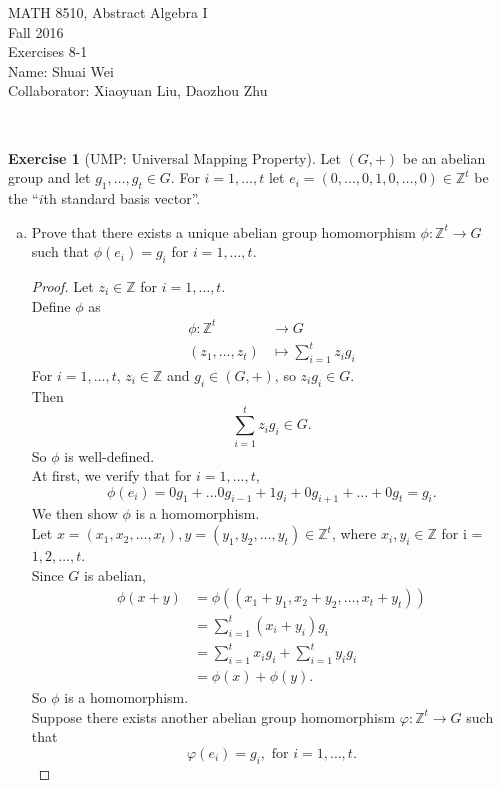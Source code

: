 \documentclass{article}
\newcommand{\bbz}{\mathbb{Z}}
\theoremstyle{plain}
\theoremstyle{definition}
\newtheorem{exer}[lem]{Exercise}
\begin{document}
\noindent MATH 8510, Abstract Algebra I \\
Fall 2016\\
Exercises 8-1\\
Name: Shuai Wei\\
Collaborator: Xiaoyuan Liu, Daozhou Zhu

\

%
%

\begin{exer}[UMP: Universal Mapping Property]
Let $(G,+)$ be an abelian group and let $g_1,\ldots,g_t\in G$. 
For $i=1,\ldots,t$ let $e_i=(0,\ldots,0,1,0,\ldots,0)\in\bbz^t$ be the ``$i$th standard basis vector''.
\begin{enumerate}[(a)]
\item 
Prove that there exists a unique abelian group homomorphism $\phi\colon\bbz^t\to G$ such that $\phi(e_i)=g_i$ for $i=1,\ldots,t$.
\begin{proof}
  Let $z_i \in \bbz$ for $i = 1,\ldots,t$.\\
  Define $\phi$ as
  \begin{align*}
  	\phi: \bbz^t &\to G \\
  			(z_1,\dots,z_t) & \mapsto \sum_{i=1}^tz_ig_i 
  \end{align*}
  For $i = 1,\ldots,t$, $z_i\in \bbz$ and $g_i \in (G,+)$, so $z_ig_i \in G$.\\
  Then 
  \[\sum_{i=1}^tz_ig_i \in G.\]
  So $\phi$ is well-defined.\\
  At first, we verify that for $i = 1,\ldots,t$,
  \[\phi(e_i) = 0g_1 + ...0g_{i-1} + 1g_i + 0g_{i+1} + \ldots + 0g_{t} = g_i.\]
  We then show $\phi$ is a homomorphism.\\
  Let $x=(x_1,x_2,\ldots,x_t), y=(y_1,y_2,\ldots,y_t) \in \bbz^t$, where $x_i,y_i \in \bbz$ for i = $1,2,\ldots,t$.\\
  Since $G$ is abelian,
  \begin{align*}
  	\phi(x+y) &= \phi((x_1+y_1,x_2+y_2,\ldots,x_t+y_t)) \\
  			 &= \sum_{i=1}^t(x_i+y_i)g_i \\
  			 &= \sum_{i=1}^tx_ig_i+\sum_{i=1}^ty_ig_i \\
  			 &= \phi(x)+\phi(y).
  \end{align*}
  So $\phi$ is a homomorphism.\\ 
  Suppose there exists another abelian group homomorphism $\varphi\colon\bbz^t\to G$ such that 
  \[\varphi(e_i)=g_i, \text{ for } {i=1,\ldots,t}.\]

\end{proof}
\end{enumerate}
\end{exer}
\end{document}
